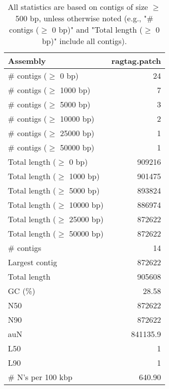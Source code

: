 \documentclass[12pt,a4paper]{article}
\begin{document}
\begin{table}[ht]
\begin{center}
\caption{All statistics are based on contigs of size $\geq$ 500 bp, unless otherwise noted (e.g., "\# contigs ($\geq$ 0 bp)" and "Total length ($\geq$ 0 bp)" include all contigs).}
\begin{tabular}{|l*{1}{|r}|}
\hline
Assembly & ragtag.patch \\ \hline
\# contigs ($\geq$ 0 bp) & 24 \\ \hline
\# contigs ($\geq$ 1000 bp) & 7 \\ \hline
\# contigs ($\geq$ 5000 bp) & 3 \\ \hline
\# contigs ($\geq$ 10000 bp) & 2 \\ \hline
\# contigs ($\geq$ 25000 bp) & 1 \\ \hline
\# contigs ($\geq$ 50000 bp) & 1 \\ \hline
Total length ($\geq$ 0 bp) & 909216 \\ \hline
Total length ($\geq$ 1000 bp) & 901475 \\ \hline
Total length ($\geq$ 5000 bp) & 893824 \\ \hline
Total length ($\geq$ 10000 bp) & 886974 \\ \hline
Total length ($\geq$ 25000 bp) & 872622 \\ \hline
Total length ($\geq$ 50000 bp) & 872622 \\ \hline
\# contigs & 14 \\ \hline
Largest contig & 872622 \\ \hline
Total length & 905608 \\ \hline
GC (\%) & 28.58 \\ \hline
N50 & 872622 \\ \hline
N90 & 872622 \\ \hline
auN & 841135.9 \\ \hline
L50 & 1 \\ \hline
L90 & 1 \\ \hline
\# N's per 100 kbp & 640.90 \\ \hline
\end{tabular}
\end{center}
\end{table}
\end{document}
